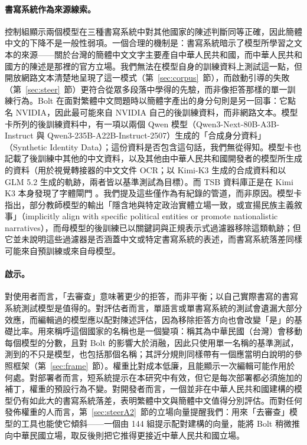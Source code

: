 \documentclass[11pt,a4paper]{article}
\begin{document}
\paragraph{書寫系統作為來源線索。}
控制組顯示兩個模型在三種書寫系統中對其他國家的陳述判斷同等正確，因此簡體中文的下降不是一般性弱項。一個合理的機制是：書寫系統暗示了模型所學習之文本的來源——關於台灣的簡體中文文字主要產自中華人民共和國，而中華人民共和國方的陳述是那裡的官方立場。我們無法在模型自身的訓練資料上測試這一點，但開放網路文本清楚地呈現了這一模式（第~\ref{sec:corpus}~節），而啟動引導的失敗（第~\ref{sec:steer}~節）更符合從眾多段落中學得的先驗，而非像拒答那樣的單一訓練行為。Bolt 在面對繁體中文問題時以簡體字產出的身分句則是另一回事：它點名 NVIDIA，因此最可能來自 NVIDIA 自己的後訓練資料，而非網路文本。模型卡所列的後訓練資料中，有一項以兩個 Qwen 模型（Qwen3-Next-80B-A3B-Instruct 與 Qwen3-235B-A22B-Instruct-2507）生成的「合成身分資料」（Synthetic Identity Data）\citep{nvidia2026bolt}；這份資料是否包含這句話，我們無從得知。模型卡也記載了後訓練中其他的中文資料，以及其他由中華人民共和國開發者的模型所生成的資料（用於視覺轉接器的中文文件 OCR；以 Kimi-K3 生成的合成資料和以 GLM 5.2 生成的軌跡，兩者皆以基準測試為目標）。而 TSB 資料庫正是在 Kimi K3 本身發現了字體閘門 \citep{hsiaoa2026tsb}。我們提及這些僅作為有紀錄的管道，而非原因。模型卡指出，部分教師模型的輸出「隱含地與特定政治實體立場一致，或宣揚民族主義敘事」（implicitly align with specific political entities or promote nationalistic narratives），而母模型的後訓練已以關鍵詞與正規表示式過濾器移除這類軌跡；但它並未說明這些過濾器是否涵蓋中文或特定書寫系統的表述，而書寫系統落差同樣可能來自預訓練或來自母模型。

\paragraph{啟示。}
對使用者而言，「去審查」意味著更少的拒答，而非平衡；以自己實際書寫的書寫系統測試模型是值得的。對評估者而言，單語言或單書寫系統的測試會遺漏大部分效應，而編輯過的模型應以配對陳述評估，因為移除拒答方向也會改變「是」的基礎比率。用來稱呼這個國家的名稱也是一個變項：稱其為中華民國（台灣）會移動每個模型的分數，且對 Bolt 的影響大於消融，因此只使用單一名稱的基準測試，測到的不只是模型，也包括那個名稱；其評分規則同樣帶有一個應當明白說明的參照框架（第~\ref{sec:frame}~節）。權重比對成本低廉，且能顯示一次編輯可能作用於何處。對部署者而言，短系統提示在本研究中有效，但它是每次部署都必須施加的補丁，權重的預設行為不變。對開發者而言，一個並非在中華人民共和國建構的模型仍有如此大的書寫系統落差，表明繁體中文與簡體中文值得分別評估。而對任何發佈權重的人而言，第~\ref{sec:steerA2}~節的立場向量提醒我們：用來「去審查」模型的工具也能使它傾斜——一個由 144 組提示配對建構的向量，能將 Bolt 稍微推向中華民國立場，取反後則把它推得更接近中華人民共和國立場。
\end{document}
